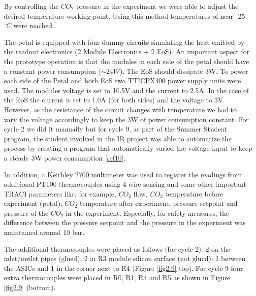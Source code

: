 		By controlling the $CO_{2}$ pressure in the experiment we were able to adjust the desired temperature working point. Using this method temperatures of near -25\space$^\circ C$ were reached.
		
		The petal is equipped with four dummy circuits simulating the heat emitted by the readout electronics (2 Module Electronics + 2 EoS). An important aspect for the prototype operation is that the modules in  each side of the petal should have a constant power consumption ($\sim 24W$). The EoS should dissipate 3W. To power each side of the Petal and both EoS two TTICPX400 power supply units were used. The modules voltage is set to 10.5V and the current to 2.5A. In the case of the EoS the current is set to 1.0A (for both sides) and the voltage to 3V. However, as the resistance of the circuit changes with temperature we had to vary the voltage accordingly to keep the 3W of power consumption constant. For cycle 2 we did it manually but for cycle 9, as part of the Summer Student program, the student involved in the IR project was able to automatize the process by creating a program that automatically varied the voltage input to keep a steady 3W power consumption \ref{ref10}.
		
		In addition, a Keithley 2700 multimeter was used to register the readings from additional PT100 thermocouples using 4 wire sensing and some other important TRACI parameters like, for example, $CO_{2}$ flow, $CO_{2}$ temperature before experiment (petal), $CO_{2}$ temperature after experiment, pressure setpoint and pressure of the $CO_{2}$ in the experiment. Especially, for safety measures, the difference between the pressure setpoint and the pressure in the experiment was maintained around 10 bar.
		
		The additional thermocouples were placed as follows (for cycle 2): 2 on the inlet/outlet pipes (glued), 2 in R3 module silicon surface (not glued): 1 between the ASICs and 1 in the corner next to R4 (Figure \ref{fig2.9} top). For cycle 9 four extra thermocouples were placed in R0, R1, R4 and R5 as shown in Figure \ref{fig2.9} (bottom).
		
